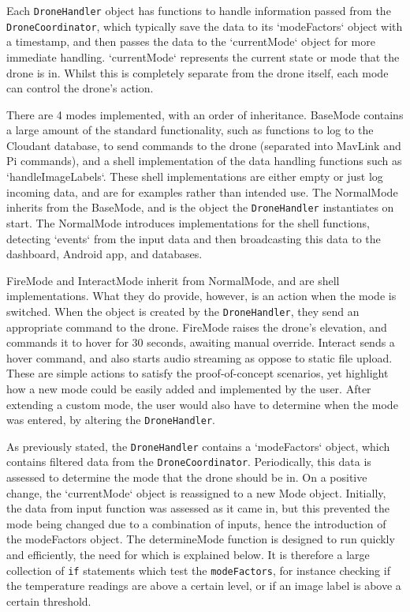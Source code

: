 \documentclass{article}
\begin{document}
Each \texttt{DroneHandler} object has functions to handle information passed from the \texttt{DroneCoordinator}, which typically save the data to its `modeFactors` object with a timestamp, and then passes the data to the `currentMode` object for more immediate handling. `currentMode` represents the current state or mode that the drone is in. Whilst this is completely separate from the drone itself, each mode can control the drone's action. 

There are 4 modes implemented, with an order of inheritance. BaseMode contains a large amount of the standard functionality, such as functions to log to the Cloudant database, to send commands to the drone (separated into MavLink and Pi commands), and a shell implementation of the data handling functions such as `handleImageLabels`. These shell implementations are either empty or just log incoming data, and are for examples rather than intended use. The NormalMode inherits from the BaseMode, and is the object the \texttt{DroneHandler} instantiates on start. The NormalMode introduces implementations for the shell functions, detecting `events` from the input data and then broadcasting this data to the dashboard, Android app, and databases. 

FireMode and InteractMode inherit from NormalMode, and are shell implementations. What they do provide, however, is an action when the mode is switched. When the object is created by the \texttt{DroneHandler}, they send an appropriate command to the drone. FireMode raises the drone's elevation, and commands it to hover for 30 seconds, awaiting manual override. Interact sends a hover command, and also starts audio streaming as oppose to static file upload. These are simple actions to satisfy the proof-of-concept scenarios, yet highlight how a new mode could be easily added and implemented by the user. After extending a custom mode, the user would also have to determine when the mode was entered, by altering the \texttt{DroneHandler}.

As previously stated, the \texttt{DroneHandler} contains a `modeFactors` object, which contains filtered data from the \texttt{DroneCoordinator}. Periodically, this data is assessed to determine the mode that the drone should be in. On a positive change, the `currentMode` object is reassigned to a new Mode object. Initially, the data from input function was assessed as it came in, but this prevented the mode being changed due to a combination of inputs, hence the introduction of the modeFactors object. The determineMode function is designed to run quickly and efficiently, the need for which is explained below. It is therefore a large collection of \texttt{if} statements which test the \texttt{modeFactors}, for instance checking if the temperature readings are above a certain level, or if an image label is above a certain threshold. 
\end{document}
